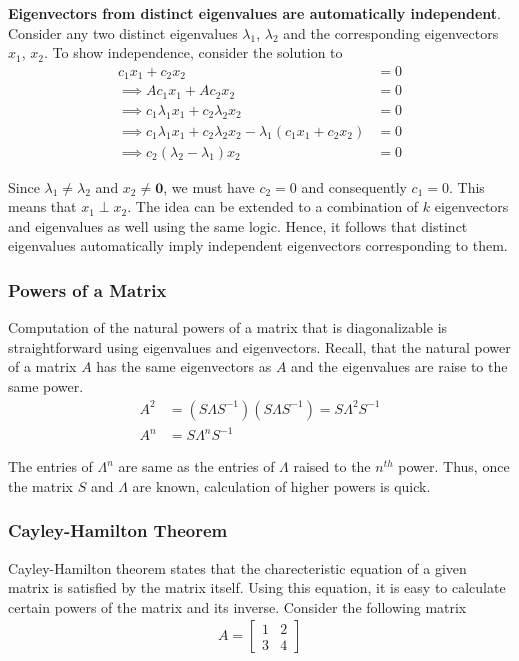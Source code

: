 \documentclass[../../linear_algebra.tex]{subfiles}
\begin{document}
\textbf{Eigenvectors from distinct eigenvalues are automatically independent}. Consider any two distinct eigenvalues $\lambda_{1}$, $\lambda_{2}$ and the corresponding eigenvectors $x_{1}$, $x_{2}$. To show independence, consider the solution to
\begin{align*}
    c_{1}x_{1} + c_{2}x_{2} &= 0\\
    \implies Ac_{1}x_{1} + Ac_{2}x_{2} &= 0\\
    \implies c_{1}\lambda_{1}x_{1} + c_{2}\lambda_{2}x_{2} &= 0\\
    \implies c_{1}\lambda_{1}x_{1} + c_{2}\lambda_{2}x_{2} - \lambda_{1}(c_{1}x_{1} + c_{2}x_{2}) &= 0\\
    \implies c_{2}(\lambda_{2} - \lambda_{1})x_{2} &= 0
\end{align*}

Since $\lambda_{1} \neq \lambda_{2}$ and $x_{2} \neq \mathbf{0}$, we must have $c_{2} = 0$ and consequently $c_{1} = 0$. This means that $x_{1} \perp x_{2}$. The idea can be extended to a combination of $k$ eigenvectors and eigenvalues as well using the same logic. Hence, it follows that distinct eigenvalues automatically imply independent eigenvectors corresponding to them.

\subsubsection{Powers of a Matrix}
Computation of the natural powers of a matrix that is diagonalizable is straightforward using eigenvalues and eigenvectors. Recall, that the natural power of a matrix $A$ has the same eigenvectors as $A$ and the eigenvalues are raise to the same power.
\begin{align*}
    A^{2} &= (S \Lambda S^{-1})(S \Lambda S^{-1}) = S \Lambda^{2} S^{-1}\\
    A^{n} &= S \Lambda^{n} S^{-1}
\end{align*}

The entries of $\Lambda^{n}$ are same as the entries of $\Lambda$ raised to the $n^{th}$ power. Thus, once the matrix $S$ and $\Lambda$ are known, calculation of higher powers is quick.

\subsubsection{Cayley-Hamilton Theorem}
Cayley-Hamilton theorem states that the charecteristic equation of a given matrix is satisfied by the matrix itself. Using this equation, it is easy to calculate certain powers of the matrix and its inverse. Consider the following matrix
\begin{align*}
    A = \begin{bmatrix}
        1 &2\\ 3 & 4
    \end{bmatrix}
\end{align*}
\end{document}
